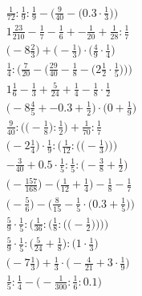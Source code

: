 \documentclass[8pt]{article}
\begin{document}
\begin{align}
\frac{1}{72} : \frac{1}{9} : \frac{1}{9} - \Big(\frac{9}{40} - \big(0.3 \cdot \frac{1}{3}\big)\Big) \\
1\frac{23}{210} - \frac{1}{7} - \frac{1}{6} + -\frac{1}{20} + \frac{1}{28} : \frac{1}{7} \\
\big(-8\frac{2}{3}\big) + \big(-\frac{1}{3}\big) \cdot \big(\frac{4}{9} \cdot \frac{1}{4}\big) \\
\frac{1}{4} : \bigg(\frac{7}{20} - \Big(\frac{29}{40} - \frac{1}{8} - \big(2\frac{1}{2} \cdot \frac{1}{5}\big)\Big)\bigg) \\
1\frac{1}{6} - \frac{1}{3} + \frac{5}{24} + \frac{1}{4} - \frac{1}{8} \cdot \frac{1}{2} \\
\big(-8\frac{4}{5} + -0.3 + \frac{1}{2}\big) \cdot \big(0 + \frac{1}{9}\big) \\
\frac{9}{40} : \Big(\big(-\frac{1}{8}\big) : \frac{1}{2}\Big) + \frac{1}{70} : \frac{1}{7} \\
\bigg(-2\frac{1}{4}\bigg) \cdot \frac{1}{9} : \bigg(\frac{1}{12} : \Big(\big(-\frac{1}{3}\big)\Big)\bigg) \\
-\frac{3}{40} + 0.5 \cdot \frac{1}{5} : \frac{1}{5} : \big(-\frac{3}{8} + \frac{1}{2}\big) \\
\big(-\frac{157}{168}\big) - \big(\frac{1}{12} + \frac{1}{4}\big) - \frac{1}{8} - \frac{1}{7} \\
\Big(-\frac{5}{6}\Big) - \Big(\frac{8}{15} - \frac{1}{5} \cdot \big(0.3 + \frac{1}{5}\big)\Big) \\
\frac{5}{9} \cdot \frac{1}{5} : \Bigg(\frac{1}{36} : \bigg(\frac{1}{8} : \Big(\big(-\frac{1}{2}\big)\Big)\bigg)\Bigg) \\
\frac{5}{9} \cdot \frac{1}{5} : \big(\frac{5}{24} + \frac{1}{8}\big) : \big(1 \cdot \frac{1}{3}\big) \\
\big(-7\frac{1}{3}\big) + \frac{1}{3} \cdot \big(-\frac{4}{21} + 3 \cdot \frac{1}{9}\big) \\
\frac{1}{5} : \frac{1}{4} - \big(-\frac{1}{300} : \frac{1}{6} : 0.1\big)
\end{align}
\end{document}
